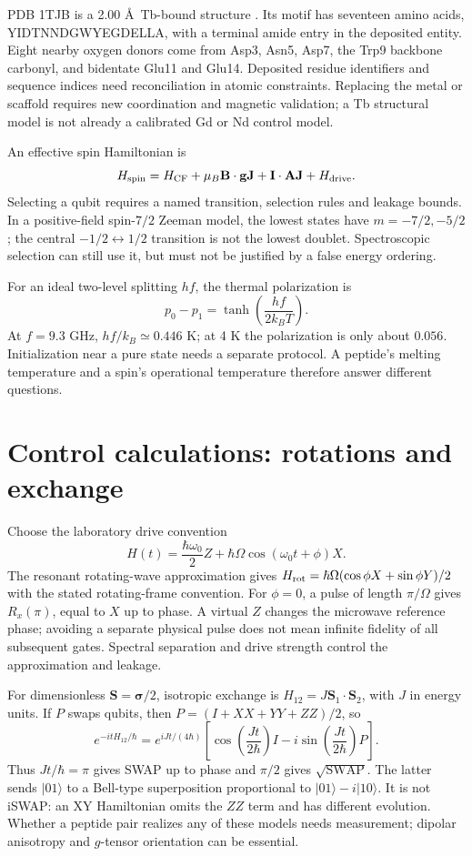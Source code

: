\documentclass[11pt,oneside,openany]{book}
\theoremstyle{definition}\newtheorem{definition}[theorem]{Definition}
\theoremstyle{remark}\newtheorem{remark}[theorem]{Remark}
\begin{document}
PDB 1TJB is a 2.00 \AA\ Tb-bound structure \cite{PhysNitz}. Its motif has
seventeen amino acids, YIDTNNDGWYEGDELLA, with a terminal amide entry in
the deposited entity. Eight nearby oxygen donors come from Asp3, Asn5,
Asp7, the Trp9 backbone carbonyl, and bidentate Glu11 and Glu14. Deposited
residue identifiers and sequence indices need reconciliation in atomic
constraints. Replacing the metal or scaffold requires new coordination
and magnetic validation; a Tb structural model is not already a calibrated
Gd or Nd control model.

An effective spin Hamiltonian is
\[
 H_{\rm spin}=H_{\rm CF}+\mu_B\mathbf B\cdot\mathbf g\mathbf J
             +\mathbf I\cdot\mathbf A\mathbf J+H_{\rm drive}.
\]
Selecting a qubit requires a named transition, selection rules and leakage
bounds. In a positive-field spin-$7/2$ Zeeman model, the lowest states
have $m=-7/2,-5/2$; the central $-1/2\leftrightarrow1/2$ transition is
not the lowest doublet. Spectroscopic selection can still use it, but
must not be justified by a false energy ordering.

For an ideal two-level splitting $hf$, the thermal polarization is
\[
 p_0-p_1=\tanh\!\left(\frac{hf}{2k_BT}\right).
\]
At $f=9.3$ GHz, $hf/k_B\simeq0.446$ K; at 4 K the polarization is only
about $0.056$. Initialization near a pure state needs a separate protocol.
A peptide's melting temperature and a spin's operational temperature
therefore answer different questions.

\section{Control calculations: rotations and exchange}
Choose the laboratory drive convention
\[
 H(t)=\frac{\hbar\omega_0}{2}Z+
       \hbar\Omega\cos(\omega_0t+\phi)X.
\]
The resonant rotating-wave approximation gives
$H_{\rm rot}=\hbar\Omega(\cos\phi X+\sin\phi Y)/2$ with the stated
rotating-frame convention. For $\phi=0$, a pulse of length $\pi/\Omega$
gives $R_x(\pi)$, equal to $X$ up to phase. A virtual $Z$ changes the
microwave reference phase; avoiding a separate physical pulse does not
mean infinite fidelity of all subsequent gates. Spectral separation and
drive strength control the approximation and leakage.

For dimensionless $\mathbf S=\boldsymbol\sigma/2$, isotropic exchange is
$H_{12}=J\mathbf S_1\cdot\mathbf S_2$, with $J$ in energy units. If $P$
swaps qubits, then $P=(I+XX+YY+ZZ)/2$, so
\begin{equation}\label{phys:exchange}
 e^{-itH_{12}/\hbar}=e^{iJt/(4\hbar)}
 \left[\cos\!\left(\frac{Jt}{2\hbar}\right)I
       -i\sin\!\left(\frac{Jt}{2\hbar}\right)P\right].
\end{equation}
Thus $Jt/\hbar=\pi$ gives SWAP up to phase and $\pi/2$ gives
$\sqrt{\mathrm{SWAP}}$. The latter sends $|01\rangle$ to a Bell-type
superposition proportional to $|01\rangle-i|10\rangle$. It is not iSWAP:
an XY Hamiltonian omits the $ZZ$ term and has different evolution.
Whether a peptide pair realizes any of these models needs measurement;
dipolar anisotropy and $g$-tensor orientation can be essential.
\end{document}
